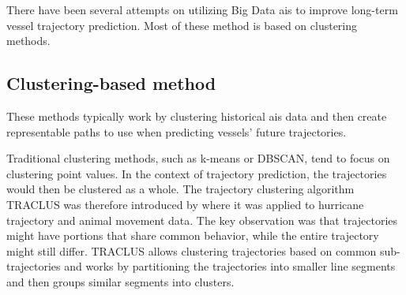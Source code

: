 There have been several attempts on utilizing Big Data \acrshort{ais} to improve long-term vessel trajectory prediction. Most of these method is based on clustering methods.

\subsection{Clustering-based method}
These methods typically work by clustering historical \acrshort{ais} data and then create representable paths to use when predicting vessels' future trajectories. 


Traditional clustering methods, such as k-means or DBSCAN, tend to focus on clustering point values. In the context of trajectory prediction, the trajectories would then be clustered as a whole. The trajectory clustering algorithm TRACLUS was therefore introduced by \cite{traclus} where it was applied to hurricane trajectory and animal movement data. The key observation was that trajectories might have portions that share common behavior, while the entire trajectory might still differ. TRACLUS allows clustering trajectories based on common sub-trajectories and works by partitioning the trajectories into smaller line segments and then groups similar segments into clusters.  
